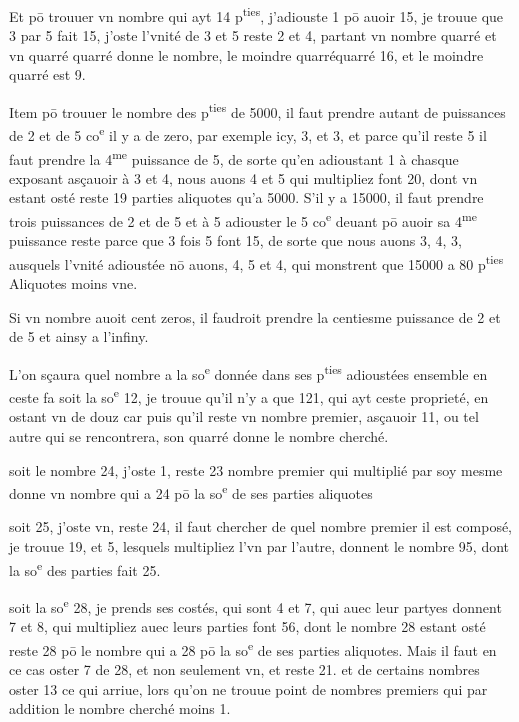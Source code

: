 \documentclass[11pt,a4paper]{article}
\begin{document}
Et pō trouuer vn nombre qui ayt 14 p\textsuperscript{ties}, j'adiouste 1 pō auoir 15, je trouue que 3 par 5 fait 15, j'oste l'vnité de 3 et 5 reste 2 et 4, partant vn nombre quarré et vn quarré quarré donne le nombre, le moindre quarréquarré  16, et le moindre quarré est 9.

Item pō trouuer le nombre des p\textsuperscript{ties} de 5000, il faut prendre autant de puissances de 2 et de 5 co\textsuperscript{e} il y a de zero, par exemple icy, 3, et 3, et parce qu'il reste 5 il faut prendre la 4\textsuperscript{me} puissance de 5, de sorte qu'en adioustant 1 à chasque exposant asçauoir à 3 et 4, nous auons 4 et 5 qui multipliez font 20, dont vn estant osté reste 19 parties aliquotes qu'a 5000. S'il y a 15000, il faut prendre trois puissances de 2 et de 5 et à 5 adiouster le 5 co\textsuperscript{e} deuant pō auoir sa 4\textsuperscript{me} puissance reste \ill{} parce que 3 fois 5 font 15, de sorte que nous auons 3, 4, 3, ausquels l'vnité adioustée nō auons, 4, 5 et 4, qui monstrent que 15000 a 80 p\textsuperscript{ties} Aliquotes moins vne.

Si vn nombre auoit cent zeros, il faudroit prendre la centiesme puissance de 2 et de 5 et ainsy a l'infiny.

L'on sçaura quel nombre a la so\textsuperscript{e} donnée dans ses p\textsuperscript{ties} adioustées ensemble en ceste fa soit la so\textsuperscript{e} 12, je trouue qu'il n'y a que 121, qui ayt ceste proprieté, en ostant vn de douz car puis qu'il reste vn nombre premier, asçauoir 11, ou tel autre qui se rencontrera, son quarré donne le nombre cherché.

soit le nombre 24, j'oste 1, reste 23 nombre premier qui multiplié par soy mesme donne vn nombre qui a 24 pō la so\textsuperscript{e} de ses parties aliquotes

soit 25, j'oste vn, reste 24, il faut chercher de quel nombre premier il est composé, je trouue 19, et 5, lesquels multipliez l'vn par l'autre, donnent le nombre 95, dont la so\textsuperscript{e} des parties fait 25.

soit la so\textsuperscript{e} 28, je prends ses costés, qui sont 4 et 7, qui auec leur partyes donnent 7 et 8, qui multipliez auec leurs parties font 56, dont le nombre 28 estant osté reste 28 pō le nombre qui a 28 pō la so\textsuperscript{e} de ses parties aliquotes. Mais il faut en ce cas oster 7 de 28, et non seulement vn, et reste 21. et de certains nombres oster 13 \ill{} ce qui arriue, lors qu'on ne trouue point de nombres premiers qui par addition \ill{} le nombre cherché moins 1.
\end{document}
